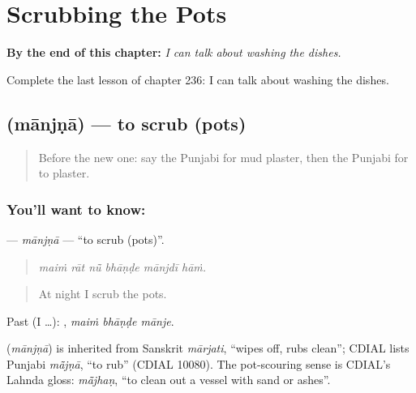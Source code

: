 
\chapter{Scrubbing the Pots}
\label{ch:pa-a2-scrubbing-the-pots}

\begin{chapteropening}
\textbf{By the end of this chapter:} \emph{I can talk about washing the dishes.}

Complete the last lesson of chapter 236: I can talk about washing the dishes.
\end{chapteropening}

\section[\texorpdfstring{\pa{ਮਾਂਜਣਾ} (mānjṇā)}{ਮਾਂਜਣਾ (mānjṇā)}]{ (mānjṇā) — to scrub (pots)}

\label{lesson:PA-C236-manjna}



\begin{quote}
Before the new one: say the Punjabi for mud plaster, then the Punjabi for to plaster.
\end{quote}

\subsection*{You'll want to know: }
\textbf{} — \emph{mānjṇā} — \textquotedblleft{}to scrub (pots)\textquotedblright{}.

\begin{quote}
     
\end{quote}

\begin{quote}
\emph{maiṁ rāt nū̃ bhāṇḍe mānjdī hāṁ.}
\end{quote}

\begin{quote}
At night I scrub the pots.
\end{quote}

Past (I …):   , \emph{maiṁ bhāṇḍe mānje}.

\begin{cousinweb}
\textbf{} (\emph{mānjṇā}) is inherited from Sanskrit \emph{mārjati}, \textquotedblleft{}wipes off, rubs clean\textquotedblright{}; CDIAL lists Punjabi \emph{mā̃jṇā}, \textquotedblleft{}to rub\textquotedblright{} (CDIAL 10080). The pot-scouring sense is CDIAL's Lahnda gloss: \emph{mā̃jhaṇ}, \textquotedblleft{}to clean out a vessel with sand or ashes\textquotedblright{}.
\end{cousinweb}

